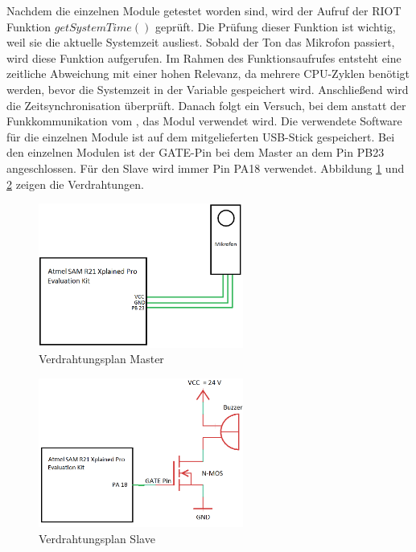 
Nachdem die einzelnen Module getestet worden sind, wird der Aufruf der RIOT Funktion $getSystemTime()$ geprüft. Die Prüfung dieser Funktion ist wichtig, weil sie die aktuelle Systemzeit ausliest. Sobald der Ton das Mikrofon passiert, wird diese Funktion aufgerufen. Im Rahmen des Funktionsaufrufes entsteht eine zeitliche Abweichung mit einer hohen Relevanz, da mehrere CPU-Zyklen benötigt werden, bevor die Systemzeit in der Variable gespeichert wird. Anschließend wird die Zeitsynchronisation überprüft. Danach folgt ein Versuch, bei dem anstatt der Funkkommunikation vom \board, das \funkempfaenger \platz Modul verwendet wird. Die verwendete Software für die einzelnen Module ist auf dem mitgelieferten USB-Stick gespeichert. Bei den einzelnen Modulen ist der \si{GATE}-Pin bei dem Master an dem Pin \si{PB23} angeschlossen. Für den Slave wird immer Pin \si{PA18} verwendet. Abbildung \ref{img:verdrahtungsplan_master} und \ref{img:verdrahtungsplan_slave} zeigen die Verdrahtungen.

\begin{figure}[H]
	\centering
	\hspace*{-2cm}
	\includegraphics[width=0.6\textwidth]{images/schaltplan_master.png}
	\caption{Verdrahtungsplan Master}
	\label{img:verdrahtungsplan_master}
\end{figure}

\begin{figure}[H]
	\centering
	\hspace*{-2cm}
	\includegraphics[width=0.6\textwidth]{images/schaltplan_slave.png}
	\caption{Verdrahtungsplan Slave}
	\label{img:verdrahtungsplan_slave}
\end{figure}




